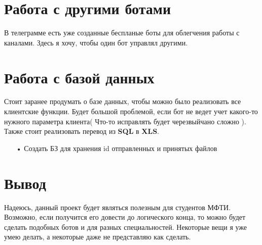   \section{Работа с другими ботами}
  В телеграмме есть уже созданные беспланые боты для облегчения работы с каналами. Здесь я хочу, чтобы один бот управлял другими.
    \section{Работа с базой данных}
   Стоит заранее продумать о базе данных, чтобы можно было реализовать все клиентские функции. Будет большой проблемой, если бот не ведет учет какого-то нужного параметра клиента( Что-то исправлять будет черезвыйчано сложно ). Также стоит реализовать перевод из \textbf{SQL} в \textbf{XLS}.
     \begin{enumerate}
     \item[•] Создать БЗ для хранения id отправленных и принятых файлов
     	 \end{enumerate}
   \section{Вывод}
	Надеюсь, данный проект будет являться полезным для студентов МФТИ. Возможно, если получится его довести до логического конца, то можно будет сделать подобных ботов и для разных специальностей.   
   Некоторые вещи я уже умею делать, а некоторые даже не представляю как сделать.
